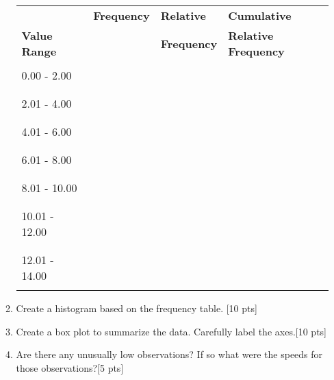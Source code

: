 \documentclass[11pt]{article}\usepackage[]{graphicx}\usepackage[]{color}
\begin{document}
\begin{enumerate}
\begin{enumerate}
  \begin{table}[h!]
     \centering
     \begin{tabular}{|l|p{3cm}|p{3cm}|p{4cm}|}
        \hline
                             & \textbf{Frequency} & \textbf{Relative} & \textbf{Cumulative}  \\
        \textbf{Value Range} &                    & \textbf{Frequency} & \textbf{Relative Frequency} \\\hline \hline
                    &  &  &  \\
      0.00 - 2.00   &  &  &  \\
                    &  &  &  \\ \hline
                    &  &  &  \\
      2.01 - 4.00   &  &  &  \\
                    &  &  &  \\ \hline
                    &  &  &  \\
      4.01 - 6.00   &  &  &  \\
                    &  &  &  \\ \hline
                    &  &  &  \\
      6.01 - 8.00   &  &  &  \\
                    &  &  &  \\ \hline
                    &  &  &  \\
      8.01 - 10.00  &  &  &  \\
                    &  &  &  \\ \hline
                    &  &  &  \\
      10.01 - 12.00 &  &  &  \\
                    &  &  &  \\ \hline
                    &  &  &  \\
      12.01 - 14.00 &  &  &  \\
                    &  &  &  \\  \hline
     \end{tabular}
  \end{table}

  \pagebreak
  
  \item Create a histogram based on the frequency table. [10 pts]
  \item Create a box plot to summarize the data. Carefully label the axes.[10 pts]

  \item Are there any unusually low observations? If so what were the speeds for those observations?[5 pts]



\end{enumerate}
\end{enumerate}
\end{document}
